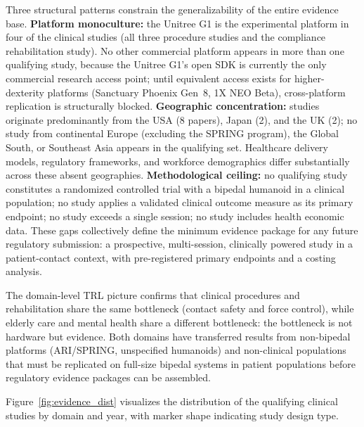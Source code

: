 Three structural patterns constrain the generalizability of the entire evidence
base. \textbf{Platform monoculture:} the Unitree G1 is the experimental platform
in four of the clinical studies (all three procedure studies and the compliance
rehabilitation study). No other commercial platform appears in more than one qualifying study,
because the Unitree G1's open SDK is currently the only commercial research
access point; until equivalent access exists for higher-dexterity platforms
(Sanctuary Phoenix Gen~8, 1X NEO Beta), cross-platform replication is
structurally blocked. \textbf{Geographic concentration:} studies originate
predominantly from the USA (8 papers), Japan (2), and the UK (2); no study from
continental Europe (excluding the SPRING program), the Global South, or Southeast
Asia appears in the qualifying set. Healthcare delivery models, regulatory
frameworks, and workforce demographics differ substantially across these absent
geographies. \textbf{Methodological ceiling:} no qualifying study constitutes a
randomized controlled trial with a bipedal humanoid in a clinical population; no
study applies a validated clinical outcome measure as its primary endpoint; no
study exceeds a single session; no study includes health economic data. These
gaps collectively define the minimum evidence package for any future regulatory
submission: a prospective, multi-session, clinically powered study in a
patient-contact context, with pre-registered primary endpoints and a costing
analysis.

The domain-level TRL picture confirms that clinical procedures and rehabilitation
share the same bottleneck (contact safety and force control), while elderly
care and mental health share a different bottleneck: the bottleneck is not
hardware but evidence. Both domains have transferred results from non-bipedal
platforms (ARI/SPRING, unspecified humanoids) and non-clinical populations that
must be replicated on full-size bipedal systems in patient populations before
regulatory evidence packages can be assembled.

Figure~\ref{fig:evidence_dist} visualizes the distribution of the qualifying
clinical studies by domain and year, with marker shape indicating study design type.

